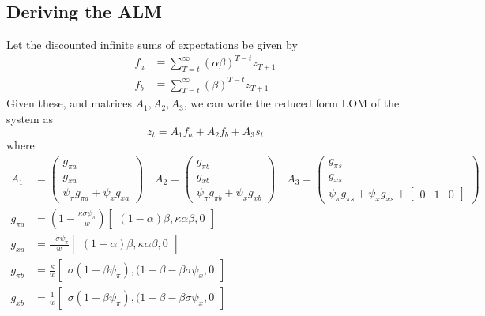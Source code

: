 \documentclass[11pt]{article}
\renewcommand{\[}{\begin{equation}}
\renewcommand{\]}{\end{equation}}
\begin{document}
\subsection{Deriving the ALM}
Let the discounted infinite sums of expectations be given by
\begin{align}
f_a & \equiv  \sum_{T=t}^{\infty} (\alpha\beta)^{T-t } z_{T+1}\\
f_b & \equiv \sum_{T=t}^{\infty} (\beta)^{T-t } z_{T+1}
\end{align}
Given these, and matrices $A_1, A_2, A_3$, we can write the reduced form LOM of the system as
\begin{equation}
z_t = A_1 f_a + A_2 f_b + A_3 s_t \tag {RF}
\end{equation}
where
\begin{align}
A_1 & = \begin{pmatrix} g_{\pi a} \\ g_{x a} \\ \psi_{\pi}g_{\pi a} + \psi_xg_{x a}
\end{pmatrix}
\quad A_2 = \begin{pmatrix} g_{\pi b} \\ g_{x b} \\ \psi_{\pi}g_{\pi b} + \psi_xg_{x b}
\end{pmatrix}
 \quad A_3 = \begin{pmatrix} g_{\pi s} \\ g_{x s} \\ \psi_{\pi}g_{\pi s} + \psi_xg_{x s} + \begin{bmatrix} 0 & 1& 0\end{bmatrix}
\end{pmatrix} \\
g_{\pi a} & =(1-\frac{\kappa\sigma\psi_{\pi}}{w} )  \begin{bmatrix}(1-\alpha)\beta, \kappa\alpha\beta, 0 \end{bmatrix} \\
g_{x a} & =  \frac{-\sigma\psi_{\pi}}{w} \begin{bmatrix}(1-\alpha)\beta, \kappa\alpha\beta, 0 \end{bmatrix}\\
g_{\pi b} & = \frac{\kappa}{w} \begin{bmatrix}\sigma(1-\beta\psi_{\pi}), (1-\beta-\beta\sigma\psi_x, 0 \end{bmatrix}\\
g_{x b} & = \frac{1}{w} \begin{bmatrix}\sigma(1-\beta\psi_{\pi}), (1-\beta-\beta\sigma\psi_x, 0 \end{bmatrix} \\

\end{align}
\end{document}
